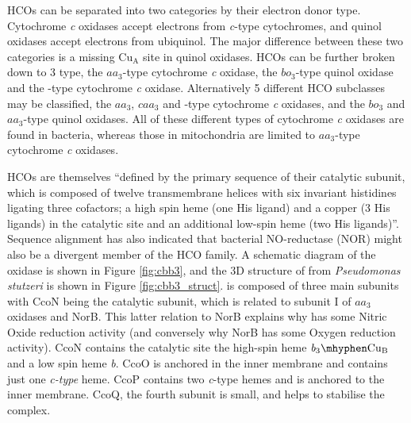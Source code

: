 HCOs can be separated into two categories by their electron donor type. Cytochrome \textit{c} oxidases accept electrons from \textit{c}-type cytochromes, and quinol oxidases accept electrons from ubiquinol. The major difference between these two categories is a missing $\mathrm{Cu}_\mathrm{A}$ site in quinol oxidases\cite{Puustinen1996}. HCOs can be further broken down to 3 type, the $\mathit{aa}_3$-type cytochrome \textit{c} oxidase, the $\mathit{bo}_3$-type quinol oxidase and the \cbbthree{}-type cytochrome \textit{c} oxidase\cite{vanderOost1994}. Alternatively 5 different HCO subclasses may be classified, the $\mathit{aa}_3$, $\mathit{caa}_3$ and \cbbthree{}-type cytochrome \textit{c} oxidases, and the $\mathit{bo}_3$ and $\mathit{aa}_3$-type quinol oxidases\cite{Garcia-Horsman1994}. All of these different types of cytochrome \textit{c} oxidases are found in bacteria, whereas those in mitochondria are limited to $\mathit{aa}_3$-type cytochrome \textit{c} oxidases\cite{Keilin1939}.

HCOs are themselves ``defined by the primary sequence of their catalytic subunit, which is composed of twelve transmembrane helices with six invariant histidines ligating three cofactors; a high spin heme (one His ligand) and a copper (3 His ligands) in the catalytic site and an additional low-spin heme (two His ligands)''\cite{Huang2010}. Sequence alignment has also indicated that bacterial NO-reductase (NOR) might also be a divergent member of the HCO family. A schematic diagram of the \cbbthree{} oxidase is shown in Figure \ref{fig:cbb3}, and the 3D structure of \cbbthree{} from \textit{Pseudomonas stutzeri} is shown in Figure \ref{fig:cbb3_struct}. \cbbthree{} is composed of three main subunits with CcoN being the catalytic subunit, which is related to subunit I of $\mathit{aa}_3$ oxidases and NorB. This latter relation to NorB explains why \cbbthree{} has some Nitric Oxide reduction activity (and conversely why NorB has some Oxygen reduction activity)\cite{Huang2010}. CcoN contains the catalytic site \textendash{} the high-spin heme $\mathit{b}_3\mhyphen\mathrm{Cu}_{\mathrm{B}}$ \textendash{} and a low spin heme \textit{b}. CcoO is anchored in the inner membrane and contains just one \textit{c-type} heme. CcoP contains two \textit{c}-type hemes and is anchored to the inner membrane. CcoQ, the fourth subunit is small, and helps to stabilise the complex\cite{Huang2010}.

